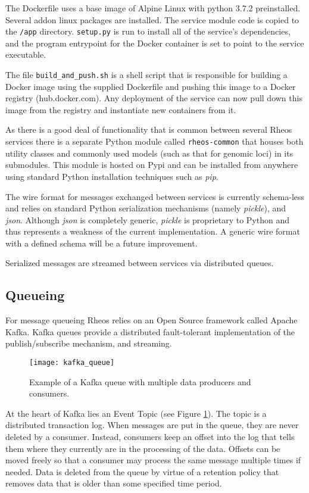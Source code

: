 The Dockerfile uses a base image of Alpine Linux with python 3.7.2 preinstalled. Several addon linux packages are installed. The service module code is copied to the \texttt{/app} directory. \texttt{setup.py} is run to install all of the service's dependencies, and the program entrypoint for the Docker container is set to point to the service executable.

The file \texttt{build_and_push.sh} is a shell script that is responsible for building a Docker image using the supplied Dockerfile and pushing this image to a Docker registry (hub.docker.com). Any deployment of the service can now pull down this image from the registry and instantiate new containers from it.

As there is a good deal of functionality that is common between several Rheos services there is a separate Python module called \texttt{rheos-common} that houses both utility classes and commonly used models (such as that for genomic loci) in its submodules. This module is hosted on Pypi and can be installed from anywhere using standard Python installation techniques such as \emph{pip}.

The wire format for messages exchanged between services is currently schema-less and relies on standard Python serialization mechanisms (namely \emph{pickle}), and \emph{json}. Although \emph{json} is completely generic, \emph{pickle} is proprietary to Python and thus represents a weakness of the current implementation. A generic wire format with a defined schema will be a future improvement.

Serialized messages are streamed between services via distributed queues.


\subsection{Queueing}

For message queueing Rheos relies on an Open Source framework called Apache Kafka\autocite{kreps2011kafka}. Kafka queues provide a distributed fault-tolerant implementation of the publish/subscribe mechanism, and streaming. 

\begin{figure}[H]
    \texttt{[image: kafka\_queue]}
    \centering
    \caption {Example of a Kafka queue with multiple data producers and consumers.}
    \label{fig:kafka_queue}
\end{figure}

At the heart of Kafka lies an Event Topic (see Figure \ref{fig:kafka_queue}). The topic is a distributed transaction log. When messages are put in the queue, they are never deleted by a consumer. Instead, consumers keep an offset into the log that tells them where they currently are in the processing of the data. Offsets can be moved freely so that a consumer may process the same message multiple times if needed. Data is deleted from the queue by virtue of a retention policy that removes data that is older than some specified time period. 

